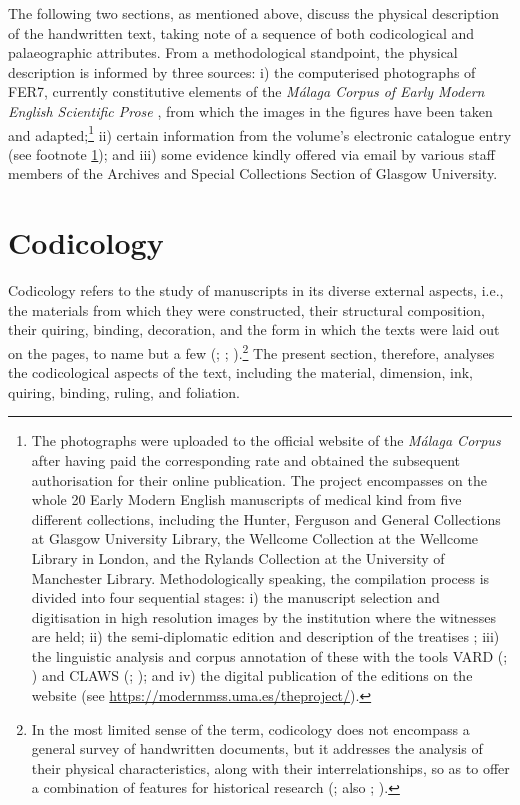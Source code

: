 \documentclass{article}
\begin{document}
The following two sections, as mentioned above, discuss the physical
description of the handwritten text, taking note of a
sequence of both codicological and palaeographic attributes. From a
methodological standpoint, the physical description is informed by three sources: i) the computerised
photographs of FER7, currently constitutive elements of the \emph{Málaga
Corpus of Early Modern English Scientific Prose} \citep{calle-martin_malaga_2016}, from which the images in the figures have
been taken and adapted;\footnote{\label{lorente:fn:4}The photographs were uploaded to the
  official website of the \emph{Málaga Corpus} after having paid the
  corresponding rate and obtained the subsequent authorisation for their
  online publication. The project encompasses on the whole 20 Early
  Modern English manuscripts of medical kind from five different
  collections, including the Hunter, Ferguson and General Collections at
  Glasgow University Library, the Wellcome Collection at the Wellcome
  Library in London, and the Rylands Collection at the University of
  Manchester Library. Methodologically speaking, the compilation process
  is divided into four sequential stages: i) the manuscript selection
  and digitisation in high resolution images by the institution where
  the witnesses are held; ii) the semi-diplomatic edition and
  description of the treatises \citep[34--35]{petti_english_1977}; iii) the linguistic
  analysis and corpus annotation of these with the tools VARD (\cite{rayson_vard_2005}; \cite{baron_vard2_2008}) and CLAWS (\cite{garside_claws_1987}; \cite{garside_hybrid_1997}); and iv) the digital publication of the editions on the
  website (see \url{https://modernmss.uma.es/theproject/}).} ii) certain
information from the volume's electronic catalogue entry (see footnote
\ref{lorente:fn:4}); and iii) some evidence kindly offered via email by various staff
members of the Archives and Special Collections Section of Glasgow
University.

\section{Codicology}

Codicology refers to the study of manuscripts in its diverse external
aspects, i.e., the materials from which they were constructed, their
structural composition, their quiring, binding, decoration, and the form
in which the texts were laid out on the pages, to name but a few (\cite[78--79]{beal_dictionary_2008}; \cite[141]{mathisen_palaeography_2008}; \cite[112]{nystrom_codicological_2014}).\footnote{In the
  most limited sense of the term, codicology does not encompass a
  general survey of handwritten documents, but it addresses the analysis
  of their physical characteristics, along with their
  interrelationships, so as to offer a combination of features for
  historical research (\cite[102]{gruijs_codicology_1972}; also \cite[34]{beal_dictionary_2008}; \cite[112]{nystrom_codicological_2014}).} The present section, therefore, analyses the
codicological aspects of the text, including the
material, dimension, ink, quiring, binding, ruling, and foliation.
\end{document}
